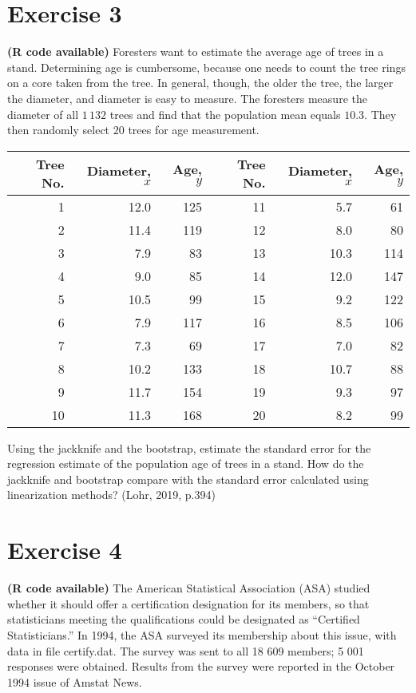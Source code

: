 \documentclass[12pt]{article}
\begin{document}
\section*{Exercise 3}
\textbf{\color{ForestGreen}(R code available)} Foresters want to estimate the average age of trees in a stand. Determining age is
cumbersome, because one needs to count the tree rings on a core taken from the
tree. In general, though, the older the tree, the larger the diameter, and diameter
is easy to measure. The foresters measure the diameter of all $1\,132$ trees and find
that the population mean equals $10.3$. They then randomly select $20$ trees for age
measurement.
\begin{center}
\begin{tabular}{rrrrrr}
Tree No. & Diameter, $x$ & Age, $y$& Tree No.& Diameter, $x$ &Age, $y$ \\
\hline
1& 12.0& 125 &11 &5.7 &61\\
2& 11.4& 119 &12& 8.0 &80\\
3& 7.9 &83 &13 &10.3& 114\\
4& 9.0 &85& 14 &12.0& 147\\
5& 10.5& 99& 15 &9.2 &122\\
6& 7.9 &117& 16 &8.5& 106\\
7& 7.3& 69 &17 &7.0& 82\\
8& 10.2& 133& 18& 10.7 &88\\
9& 11.7& 154 &19 &9.3 &97\\
10& 11.3& 168 &20& 8.2& 99\\
\end{tabular}
\end{center}
Using the jackknife and the bootstrap, estimate the standard error for the regression estimate of the
population age of trees in a stand. How
do the jackknife and bootstrap compare with the standard error calculated using linearization
methods? \hfill (Lohr, 2019, p.394)

\section*{Exercise 4}
\textbf{\color{ForestGreen}(R code available)} The American Statistical Association (ASA) studied whether it should offer a certification
designation for its members, so that statisticians meeting the qualifications
could be designated as “Certified Statisticians.” In 1994, the ASA surveyed its membership
about this issue, with data in file certify.dat. The survey was sent to all 18 609
members; 5 001 responses were obtained. Results from the survey were reported in
the October 1994 issue of Amstat News.
\end{document}
